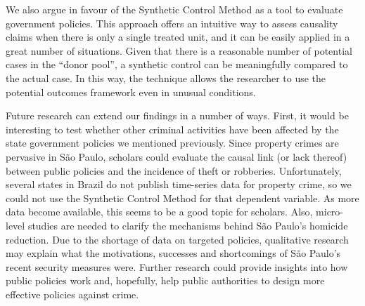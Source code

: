 \documentclass[a4paper,11pt]{article}
\begin{document}
We also argue in favour of the Synthetic Control Method as a tool to evaluate government policies. This approach offers an intuitive way to assess causality claims when there is only a single treated unit, and it can be easily applied in a great number of situations. Given that there is a reasonable number of potential cases in the ``donor pool'', a synthetic control can be meaningfully compared to the actual case. In this way, the technique allows the researcher to use the potential outcomes framework even in unusual conditions. 

Future research can extend our findings in a number of ways. First, it would be interesting to test whether other criminal activities have been affected by the state government policies we mentioned previously. Since property crimes are pervasive in S\~{a}o Paulo, scholars could evaluate the causal link (or lack thereof) between public policies and the incidence of theft or robberies. Unfortunately, several states in Brazil do not publish time-series data for property crime, so we could not use the Synthetic Control Method for that dependent variable. As more data become available, this seems to be a good topic for scholars. Also, micro-level studies are needed to clarify the mechanisms behind S\~{a}o Paulo's homicide reduction. Due to the shortage of data on targeted policies, qualitative research may explain what the motivations, successes and shortcomings of S\~{a}o Paulo's recent security measures were. Further research could provide insights into how public policies work and, hopefully, help public authorities to design more effective policies against crime.

\newpage


\end{document}
